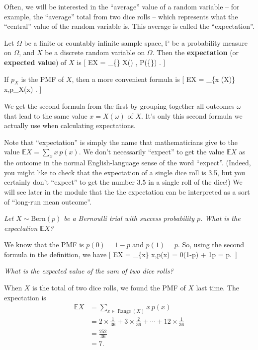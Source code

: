 \documentclass[
  letterpaper,
  DIV=11,
  numbers=noendperiod]{scrreprt}
\theoremstyle{remark}
\begin{document}
Often, we will be interested in the ``average'' value of a random
variable -- for example, the ``average'' total from two dice rolls --
which represents what the ``central'' value of the random variable is.
This average is called the ``expectation''.

Let \(\Omega\) be a finite or countably infinite sample space,
\(\mathbb P\) be a probability measure on \(\Omega\), and \(X\) be a
discrete random variable on \(\Omega\). Then the \textbf{expectation}
(or \textbf{expected value}) of \(X\) is {[} \mathbb EX =
\sum\_\{\omega \in \Omega\} X(\omega) , \mathbb P(\{\omega\}) . {]}

If \(p_X\) is the PMF of \(X\), then a more convenient formula is {[}
\mathbb EX = \sum\_\{x \in {}(X)\} x,p\_X(x) . {]}

We get the second formula from the first by grouping together all
outcomes \(\omega\) that lead to the same value \(x = X(\omega)\) of
\(X\). It's only this second formula we actually use when calculating
expectations.

Note that ``expectation'' is simply the name that mathematicians give to
the value \(\mathbb EX = \sum_x x\, p(x)\). We don't necessarily
``expect'' to get the value \(\mathbb EX\) as the outcome in the normal
English-language sense of the word ``expect''. (Indeed, you might like
to check that the expectation of a single dice roll is 3.5, but you
certainly don't ``expect'' to get the number 3.5 in a single roll of the
dice!) We will see later in the module that the the expectation can be
interpreted as a sort of ``long-run mean outcome''.

\emph{Let \(X \sim \text{Bern}(p)\) be a Bernoulli trial with success
probability \(p\). What is the expectation \(\mathbb EX\)?}

We know that the PMF is \(p(0) = 1- p\) and \(p(1) = p\). So, using the
second formula in the definition, we have {[} \mathbb EX = \sum\_\{x\}
x,p(x) = 0\times (1-p) + 1\times p = p.~{]}

\emph{What is the expected value of the sum of two dice rolls?}

When \(X\) is the total of two dice rolls, we found the PMF of \(X\)
last time. The expectation is \begin{align*}
  \mathbb EX &= \sum_{x \in \operatorname{Range}(X)} x\,p(x)  \\
    &= 2 \times \tfrac{1}{36} + 3 \times \tfrac{2}{36} + \cdots + 12 \times \tfrac{1}{36} \\
    &= \tfrac{252}{36} \\
    &= 7 .
\end{align*}
\end{document}
